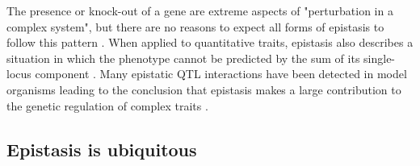The presence or knock-out of a gene are extreme aspects of "perturbation in a complex system", but there are no reasons to expect all forms of epistasis to follow this pattern \cite{phillips2008epistasis}.
When applied to quantitative traits, epistasis also describes a situation in which the phenotype cannot be predicted by the sum of its single-locus component \cite{carlborg2004epistasis}.
Many epistatic QTL interactions have been detected in model organisms leading to the conclusion that epistasis makes a large contribution to the genetic regulation of complex traits  \cite{carlborg2004epistasis}.



\subsection{Epistasis is ubiquitous}

